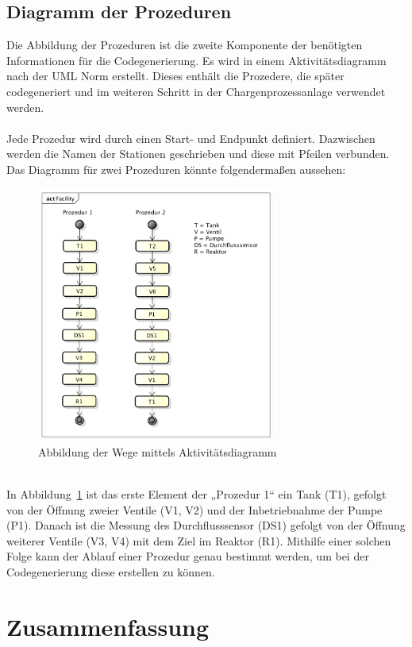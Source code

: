 
\subsection{Diagramm der Prozeduren}
Die Abbildung der Prozeduren ist die zweite Komponente der benötigten Informationen für die Codegenerierung. Es wird in einem Aktivitätsdiagramm nach der \ac{UML} Norm erstellt. Dieses enthält die Prozedere, die später codegeneriert und im weiteren Schritt in der Chargenprozessanlage verwendet werden. \\\\
Jede Prozedur wird durch einen Start- und Endpunkt definiert. Dazwischen werden die Namen der Stationen geschrieben und diese mit Pfeilen verbunden. Das Diagramm für zwei Prozeduren könnte folgendermaßen aussehen: 
\begin{figure}[h!]
		\centering
		\includegraphics[width=0.7\textwidth]{graphics/konzept/UML_Activity.png}
		\caption{Abbildung der Wege mittels Aktivitätsdiagramm}
		\label{fig:konz_UML_Activity}
\end{figure}\\
In Abbildung~\ref{fig:konz_UML_Activity} ist das erste Element der „Prozedur 1“ ein Tank (T1), gefolgt von der Öffnung zweier Ventile (V1, V2) und der Inbetriebnahme der Pumpe (P1). Danach ist die Messung des Durchflusssensor (DS1) gefolgt von der Öffnung weiterer Ventile (V3, V4) mit dem Ziel im Reaktor (R1). 
Mithilfe einer solchen Folge kann der Ablauf einer Prozedur genau bestimmt werden, um bei der Codegenerierung diese erstellen zu können. 

\section{Zusammenfassung}
